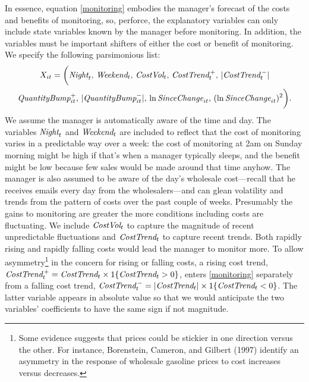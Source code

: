 \documentclass[11pt]{article}
\newcommand{\SinceChange}{\mbox{\it SinceChange}}
\newcommand{\CostTrend}{\mbox{\it CostTrend}}
\newcommand{\CostVol}{\mbox{\it CostVol}}
\newcommand{\Night}{\mbox{\it Night}}
\newcommand{\Weekend}{\mbox{\it Weekend}}
\newcommand{\QuantityBump}{\mbox{\it QuantityBump}}
\begin{document}
\begin{spacing}{1.3}
In essence, equation \eqref{monitoring} embodies the manager's
forecast of the costs and benefits of monitoring, so, perforce, the
explanatory variables can only include state variables known by the
manager before monitoring. In addition, the variables must be
important shifters of either the cost or benefit of monitoring. We
specify the following parsimonious list:
\begin{multline}
\label{X}
X_{it} = \biggl(\Night_t, \, \Weekend_t, \, \CostVol_t, \,
\CostTrend_t^{\,+}, \, \vert \CostTrend_t^{\,-} \vert \\ 
\QuantityBump_{it}^+, \, \vert \QuantityBump_{it}^- \vert, \, \ln
\SinceChange_{it}, \, (\ln \SinceChange_{it})^2 \biggr).
\end{multline}
We assume the manager is automatically aware of the time and day. The
variables $\Night_{t}$ and $\Weekend_{t}$ are included to reflect that
the cost of monitoring varies in a predictable way over a week: the
cost of monitoring at 2am on Sunday morning might be high if that's
when a manager typically sleeps, and the benefit might be low because
few sales would be made around that time anyhow.  The manager is also
assumed to be aware of the day's wholesale cost---recall that he
receives emails every day from the wholesalers---and can glean
volatility and trends from the pattern of costs over the past couple
of weeks. Presumably the gains to monitoring are greater the more
conditions including costs are fluctuating. We include $\CostVol_{t}$
to capture the magnitude of recent unpredictable fluctuations and
$\CostTrend_t$ to capture recent trends. Both rapidly rising and
rapidly falling costs would lead the manager to monitor more. To allow
asymmetry\footnote{Some evidence suggests that prices could be
  stickier in one direction versus the other.  For instance,
  Borenstein, Cameron, and Gilbert (1997) identify an asymmetry in the
  response of wholesale gasoline prices to cost increases versus
  decreases.} in the concern for rising or falling costs, a rising
cost trend, $\CostTrend_t^{\,+} = \CostTrend_t \times 1\{\CostTrend_t
> 0\}$, enters \eqref{monitoring} separately from a falling cost
trend, $\CostTrend_t^{\,-} = |\CostTrend_t| \times 1\{\CostTrend_t <
0\}$. The latter variable appears in absolute value so that we would
anticipate the two variables' coefficients to have the same sign if
not magnitude.


\end{spacing}
\end{document}
